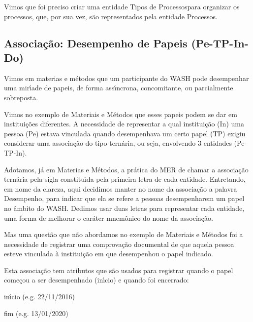 \documentclass[
12pt,		%
openright,	%
twoside,  %
a4paper,			%
chapter=TITLE,		%
english,			%
french,				%
spanish,			%
brazil				%
]{USPSC-classe/USPSC}
\begin{document}
Vimos que foi preciso criar uma entidade \textquotedbl Tipos de Processos\textquotedbl  para organizar os processos, que, por sua vez, s\~ao representados pela entidade \textquotedbl Processos\textquotedbl .




\subsection[Associa\c{c}\~ao: Desempenho de Papeis (Pe-TP-In-Do)]{Associa\c{c}\~ao: Desempenho de Papeis (Pe-TP-In-Do)}\label{Associa\c{c}\~ao: Desempenho de Papeis (Pe-TP-In-Do)}
Vimos em materias e m\'etodos que um participante do WASH pode desempenhar uma mir\'{\i}ade de papeis, de forma ass\'{\i}ncrona, concomitante, ou parcialmente sobreposta.




Vimos no exemplo de Materiais e M\'etodos que esses papeis podem se dar em institui\c{c}\~oes diferentes. A necessidade de representar a qual institui\c{c}\~ao (In) uma pessoa (Pe) estava vinculada quando desempenhava um certo papel (TP) exigiu considerar uma associa\c{c}\~ao do tipo tern\'aria, ou seja, envolvendo 3 entidades (Pe-TP-In).




Adotamos, j\'a em Materias e M\'etodos, a pr\'atica do MER de chamar a associa\c{c}\~ao tern\'aria pela sigla constitu\'{\i}da pela primeira letra de cada entidade. Entretando, em nome da clareza, aqui decidimos manter no nome da associa\c{c}\~ao a palavra \textquotedbl Desempenho\textquotedbl , para indicar que ela se refere a \textquotedbl pessoas desempenharem um papel no \^ambito do WASH\textquotedbl . Dedimos usar duas letras para representar cada entidade, uma forma de melhorar o car\'ater mnem\^onico do nome da associa\c{c}\~ao.




Mas uma quest\~ao que n\~ao abordamos no exemplo de Materiais e M\'etodos foi a necessidade de registrar uma comprova\c{c}\~ao documental de que aquela pessoa esteve vinculada \`a institui\c{c}\~ao em que desempenhou o papel indicado.




Esta associa\c{c}\~ao tem atributos que s\~ao usados para registrar quando o papel come\c{c}ou a ser desempenhado (in\'{\i}cio) e quando foi encerrado:





\begin{alineas}
\item in\'{\i}cio (e.g. 22/11/2016)
\item fim (e.g. 13/01/2020)
\end{alineas}
\end{document}
